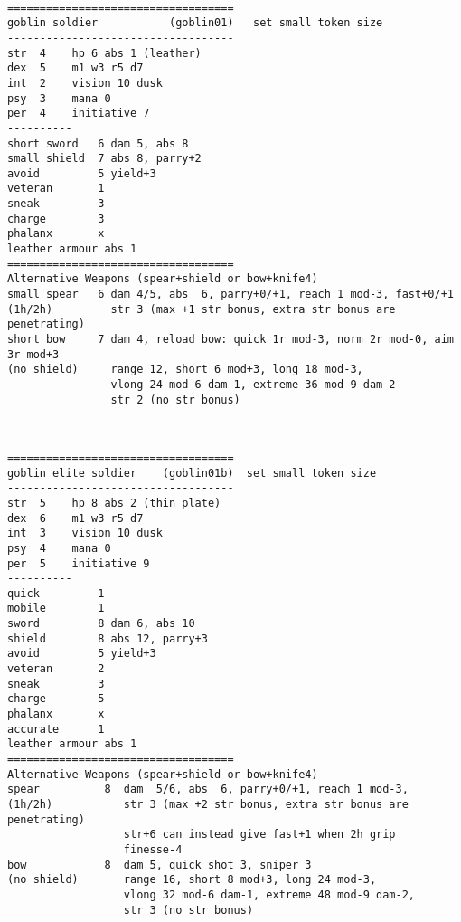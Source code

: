 \

\goodbreak \begin{samepage} \small \begin{verbatim}
===================================
goblin soldier           (goblin01)   set small token size
-----------------------------------
str  4    hp 6 abs 1 (leather)
dex  5    m1 w3 r5 d7
int  2    vision 10 dusk
psy  3    mana 0
per  4    initiative 7
----------
short sword   6 dam 5, abs 8
small shield  7 abs 8, parry+2
avoid         5 yield+3
veteran       1
sneak         3
charge        3
phalanx       x
leather armour abs 1
===================================
Alternative Weapons (spear+shield or bow+knife4)
small spear   6 dam 4/5, abs  6, parry+0/+1, reach 1 mod-3, fast+0/+1
(1h/2h)         str 3 (max +1 str bonus, extra str bonus are penetrating)
short bow     7 dam 4, reload bow: quick 1r mod-3, norm 2r mod-0, aim 3r mod+3
(no shield)     range 12, short 6 mod+3, long 18 mod-3,
                vlong 24 mod-6 dam-1, extreme 36 mod-9 dam-2
                str 2 (no str bonus)
\end{verbatim} \normalsize \end{samepage}

\

\goodbreak \begin{samepage} \small \begin{verbatim}
===================================
goblin elite soldier    (goblin01b)  set small token size
-----------------------------------
str  5    hp 8 abs 2 (thin plate)
dex  6    m1 w3 r5 d7
int  3    vision 10 dusk
psy  4    mana 0
per  5    initiative 9
----------
quick         1
mobile        1
sword         8 dam 6, abs 10
shield        8 abs 12, parry+3
avoid         5 yield+3
veteran       2
sneak         3
charge        5
phalanx       x
accurate      1
leather armour abs 1
===================================
Alternative Weapons (spear+shield or bow+knife4)
spear          8  dam  5/6, abs  6, parry+0/+1, reach 1 mod-3,
(1h/2h)           str 3 (max +2 str bonus, extra str bonus are penetrating)
                  str+6 can instead give fast+1 when 2h grip
                  finesse-4
bow            8  dam 5, quick shot 3, sniper 3
(no shield)       range 16, short 8 mod+3, long 24 mod-3,
                  vlong 32 mod-6 dam-1, extreme 48 mod-9 dam-2,
                  str 3 (no str bonus)
\end{verbatim} \normalsize \end{samepage}

\

